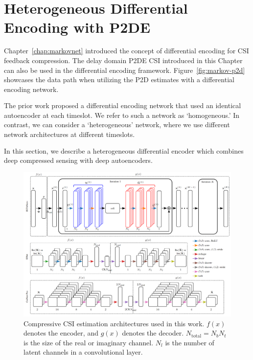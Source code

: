 \section{Heterogeneous Differential Encoding with P2DE}
\label{sect:hetero-markov}

Chapter~\ref{chap:markovnet} introduced the concept of differential encoding for CSI feedback compression. The delay domain P2DE CSI introduced in this Chapter can also be used in the differential encoding framework. Figure~\ref{fig:markov-p2d} showcases the data path when utilizing the P2D estimates with a differential encoding network.

The prior work proposed a differential encoding network that used an identical autoencoder at each timeslot. We refer to such a network as `homogeneous.' In contrast, we can consider a `heterogeneous' network, where we use different network architectures at different timeslots.

In this section, we describe a heterogeneous differential encoder which combines deep compressed sensing with deep autoencoders.

\begin{figure}[!hbtp]
    \centering
    \includegraphics[width=\linewidth]{images/arch-comparison.png}
    \caption{Compressive CSI estimation architectures used in this work. $f(x)$ denotes the encoder, and $g(x)$ denotes the decoder. $N_{\text{total}}=N_bN_t$ is the size of the real or imaginary channel. $N_l$ is the number of latent channels in a convolutional layer.}
    \label{fig:arch_compare}
\end{figure}

